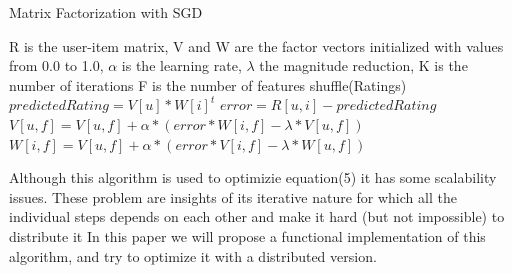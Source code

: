 \documentclass{sig-alternate-05-2015}
\begin{document}
\begin{algorithm}
    \caption{Matrix Factorization with SGD}

    \begin{algorithmic}[1]
        \Require
            \Statex R is the user-item matrix,
            \Statex V and W are the factor vectors initialized with values from 0.0 to 1.0,
            \Statex $\alpha$ is the learning rate,
            \Statex $\lambda$ the magnitude reduction,
            \Statex K is the number of iterations
            \Statex F is the number of features
    \State shuffle(Ratings)
            \State $predictedRating = V[u] * W[i]^{t}$
            \State $error = R[u,i] - predictedRating$
                    \State $V[u,f] = V[u,f] + \alpha * (error * W[i,f] - \lambda * V[u,f])$
                    \State $W[i,f] = V[u,f] + \alpha * (error * V[i,f] - \lambda * W[u,f])$
                \EndFor
        \EndFor
    \EndFor
    \end{algorithmic}
\end{algorithm}

Although this algorithm is used to optimizie equation(5) it has some
scalability issues. These problem are insights of its iterative nature
for which all the individual steps depends on each other and make it hard (but
not impossible) to distribute it
In this paper we will propose a functional implementation of this algorithm,
and try to optimize it with a distributed version.
\end{document}
